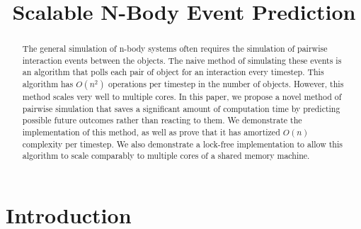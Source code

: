 \documentclass[conference]{IEEEtran}
\begin{document}
%
\title{Scalable N-Body Event Prediction}


\author{
\and{}
}

\maketitle


\begin{abstract} %
The general simulation of n-body systems often requires the simulation of pairwise interaction events between the objects.  The naive method of simulating these events is an algorithm that polls each pair of object for an interaction every timestep.  This algorithm has $O(n^2)$ operations per timestep in the number of objects.  However, this method scales very well to multiple cores. In this paper, we propose a novel method of pairwise simulation that saves a significant amount of computation time by predicting possible future outcomes rather than reacting to them.  We demonstrate the implementation of this method, as well as prove that it has amortized $O(n)$ complexity per timestep.  We also demonstrate a lock-free implementation to allow this algorithm to scale comparably to multiple cores of a shared memory machine.
\end{abstract}

\IEEEpeerreviewmaketitle


\section{Introduction}
\end{document}
